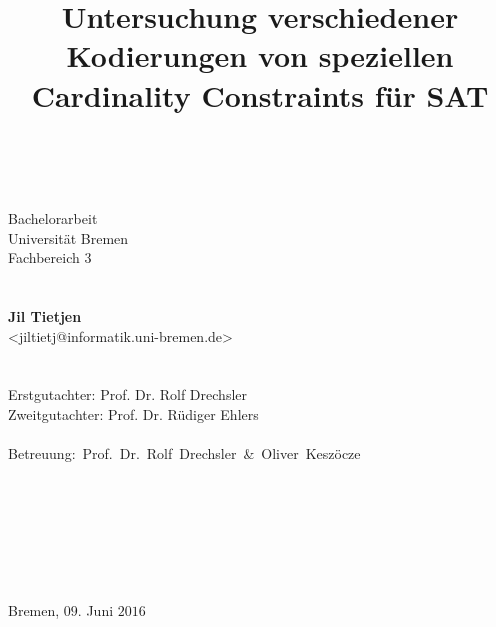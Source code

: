 \documentclass[a4,abstract=on]{scrartcl}
\title{Untersuchung verschiedener Kodierungen von speziellen Cardinality Constraints für SAT}
\date{~}
\begin{document}
	\maketitle
\thispagestyle{empty}
\begin{center}
\begin{Large}
Bachelorarbeit\\Universität Bremen\\Fachbereich $3$\\
~\\~\\
\textbf{Jil Tietjen}\\<jiltietj@informatik.uni-bremen.de>\\
~\\~\\
Erstgutachter: Prof. Dr. Rolf Drechsler\\
Zweitgutachter: Prof. Dr. Rüdiger Ehlers\\~\\
\mbox{Betreuung: Prof. Dr. Rolf Drechsler \&~Oliver Keszöcze}\\~\\~\\~\\~\\~\\~\\~\\
Bremen, $09$. Juni $2016$
\end{Large}
\end{center}
		
\end{document}
